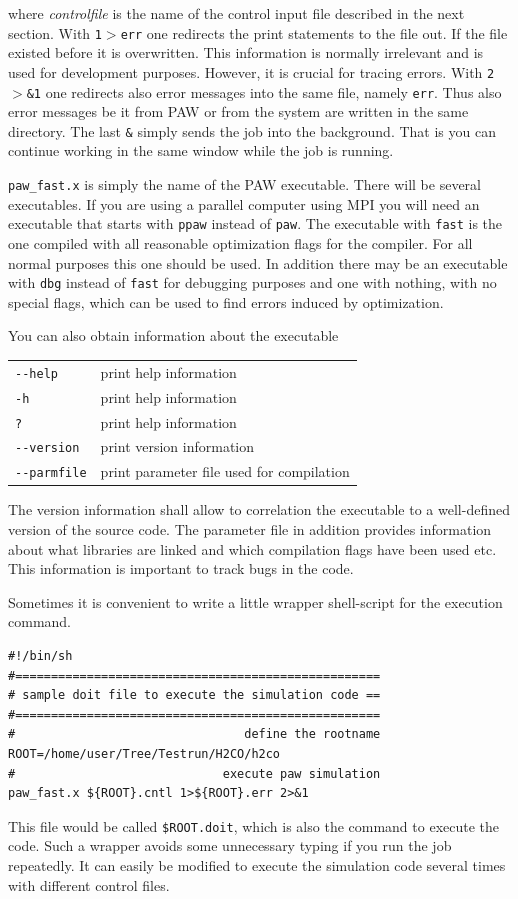 \documentclass[final,12pt]{article}
\begin{document}
\noindent where {\it controlfile} is the name of the control input
file described in the next section.  With {\tt 1$>$err} one redirects
the print statements to the file out. If the file existed before it is
overwritten. This information is normally irrelevant and is used for
development purposes. However, it is crucial for tracing errors.  With
{\tt 2$>$\&1} one redirects also error messages into the same file,
namely {\tt err}. Thus also error messages be it from PAW or from the
system are written in the same directory. The last {\tt \&} simply
sends the job into the background. That is you can continue working in
the same window while the job is running.

{\tt paw\_fast.x} is simply the name of the PAW executable. There will
be several executables. If you are using a parallel computer using MPI
you will need an executable that starts with {\tt ppaw} instead of
{\tt paw}. The executable with {\tt fast} is the one compiled with all
reasonable optimization flags for the compiler. For all normal
purposes this one should be used. In addition there may be an
executable with {\tt dbg} instead of {\tt fast} for debugging purposes
and one with nothing, with no special flags, which can be used to find
errors induced by optimization.

You can also obtain information about the executable
\begin{center}
\begin{tabular}{ll}
\verb+--help+ & print help information \\
\verb+-h+ & print help information \\
\verb+?+ & print help information \\
\verb+--version+ & print version information\\
\verb+--parmfile+ & print parameter file used for compilation\\
\end{tabular}
\end{center}
The version information shall allow to correlation the executable to a
well-defined version of the source code. The parameter file in
addition provides information about what libraries are linked and
which compilation flags have been used etc. This information is
important to track bugs in the code.

Sometimes it is convenient to write a little wrapper shell-script for
the execution command.
\begin{verbatim}
#!/bin/sh
#===================================================
# sample doit file to execute the simulation code ==
#===================================================
#                                define the rootname 
ROOT=/home/user/Tree/Testrun/H2CO/h2co                               
#                             execute paw simulation
paw_fast.x ${ROOT}.cntl 1>${ROOT}.err 2>&1
\end{verbatim}
This file would be called {\tt \${ROOT}.doit}, which is
also the command to execute the code.  Such a wrapper avoids some
unnecessary typing if you run the job repeatedly. It can easily be
modified to execute the simulation code several times with different
control files.
\end{document}
